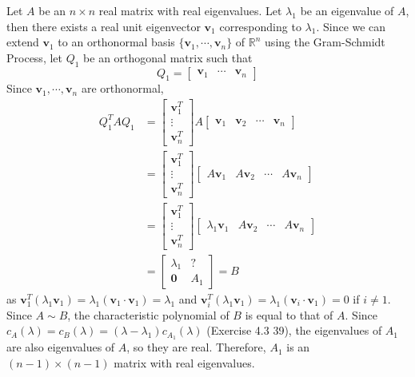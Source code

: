 Let $A$ be an $n \times n$ real matrix with real eigenvalues. Let $\lambda_1$ be an eigenvalue of $A$, then there exists a real unit eigenvector $\textbf{v}_1$ corresponding to $\lambda_1$. Since we can extend $\textbf{v}_1$ to an orthonormal basis $\{ \textbf{v}_1, \cdots, \textbf{v}_n \}
$ of $\mathbb{R}^n$ using the Gram-Schmidt Process, let $Q_1$ be an orthogonal matrix such that \begin{equation*}
	Q_1 = \begin{bmatrix}
		\textbf{v}_1 & \cdots & \textbf{v}_n
	\end{bmatrix}
\end{equation*} Since $\textbf{v}_1, \cdots, \textbf{v}_n$ are orthonormal, \begin{align*}
	Q_1^TAQ_1 &= \begin{bmatrix}
		\textbf{v}_1^T \\ \vdots \\ \textbf{v}_n^T
	\end{bmatrix}A\begin{bmatrix}
		\textbf{v}_1 & \textbf{v}_2 & \cdots & \textbf{v}_n
	\end{bmatrix} \\
	&= \begin{bmatrix}
		\textbf{v}_1^T \\ \vdots \\ \textbf{v}_n^T
	\end{bmatrix}\begin{bmatrix}
		A\textbf{v}_1 & A\textbf{v}_2 &  \cdots & A\textbf{v}_n
	\end{bmatrix} \\
	&= \begin{bmatrix}
		\textbf{v}_1^T \\ \vdots \\ \textbf{v}_n^T
	\end{bmatrix} \begin{bmatrix}
		\lambda_1\textbf{v}_1 & A\textbf{v}_2 & \cdots & A\textbf{v}_n
	\end{bmatrix} \\
	&= \begin{bmatrix}
		\lambda_1 & ? \\
		\textbf{0} & A_1
	\end{bmatrix} = B
\end{align*} as $\textbf{v}_1^T(\lambda_1\textbf{v}_1) = \lambda_1(\textbf{v}_1 \cdot \textbf{v}_1) = \lambda_1$ and $\textbf{v}_i^T(\lambda_1\textbf{v}_1) = \lambda_1(\textbf{v}_i \cdot \textbf{v}_1) = 0$ if $i \neq 1$. Since $A \sim B$, the characteristic polynomial of $B$ is equal to that of $A$. Since $c_A(\lambda) = c_B(\lambda) = (\lambda - \lambda_1)c_{A_1}(\lambda)$ (Exercise 4.3 39), the eigenvalues of $A_1$ are also eigenvalues of $A$, so they are real. Therefore, $A_1$ is an $(n-1) \times (n-1)$ matrix with real eigenvalues. \\

